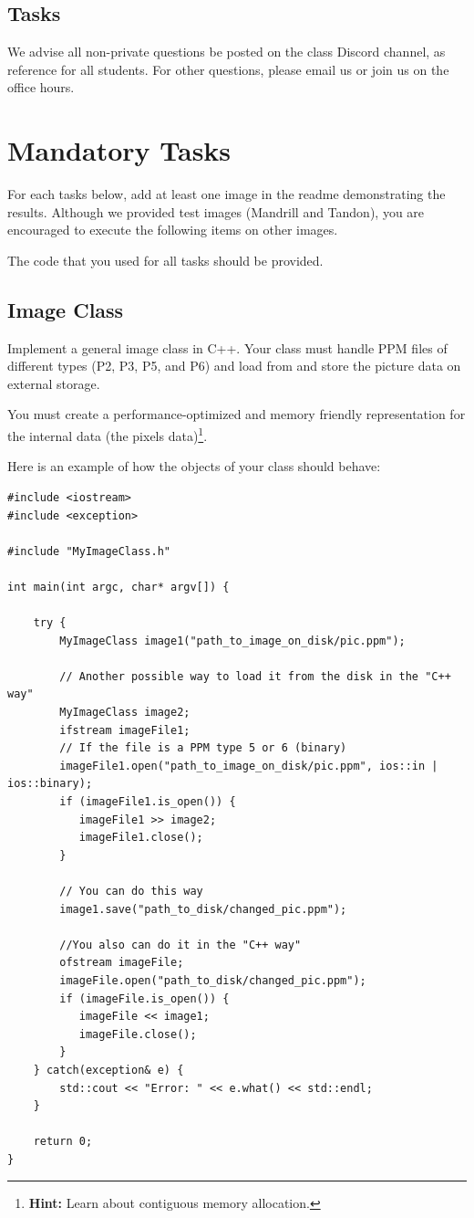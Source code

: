 \documentclass[11pt]{article}
\begin{document}
\subsection*{Tasks}
\vspace{-2mm}
We advise all non-private questions be posted on the class Discord channel, as reference for all students.
For other questions, please email us or join us on the office hours.
\vspace{-3mm}

\section{Mandatory Tasks}
\vspace{-4mm}
For each tasks below, add at least one image in the readme demonstrating the results. Although we provided test images (Mandrill and Tandon), you are encouraged to execute the following items on other images.

The code that you used for all tasks should be provided.
\vspace{-3mm}

\subsection{Image Class}
\vspace{-3mm}
Implement a general image class in C++. Your class must handle PPM files of different types (P2, P3, P5, and P6) and load from and store the picture data on external storage.

You must create a performance-optimized and memory friendly representation for the internal data (the pixels data)\footnote{\textbf{Hint:} Learn about contiguous memory allocation.}.

Here is an example of how the objects of your class should behave:

\scriptsize
\begin{verbatim}
#include <iostream>
#include <exception>

#include "MyImageClass.h"

int main(int argc, char* argv[]) {

    try {
        MyImageClass image1("path_to_image_on_disk/pic.ppm");
        
        // Another possible way to load it from the disk in the "C++ way"
        MyImageClass image2;
        ifstream imageFile1;
        // If the file is a PPM type 5 or 6 (binary)
        imageFile1.open("path_to_image_on_disk/pic.ppm", ios::in | ios::binary);
        if (imageFile1.is_open()) {
           imageFile1 >> image2;
           imageFile1.close();
        }

        // You can do this way
        image1.save("path_to_disk/changed_pic.ppm");

        //You also can do it in the "C++ way"
        ofstream imageFile;
        imageFile.open("path_to_disk/changed_pic.ppm");
        if (imageFile.is_open()) {
           imageFile << image1;
           imageFile.close();
        }
    } catch(exception& e) {
        std::cout << "Error: " << e.what() << std::endl;
    }

    return 0;
}
\end{verbatim}
\normalsize
\end{document}
